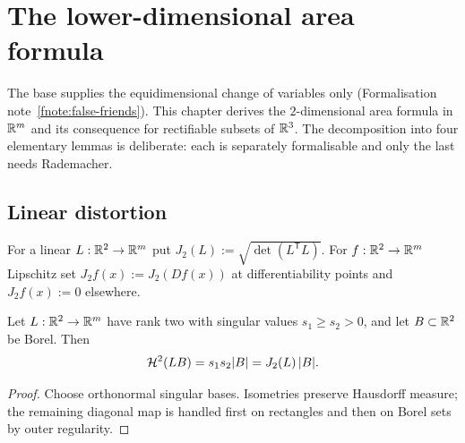 \chapter{The lower-dimensional area formula}\label{ch:area}

The base supplies the equidimensional change of variables only
(Formalisation note~\ref{fnote:false-friends}).  This chapter derives the
$2$-dimensional area formula in $\mathbb R^m$ and its consequence for rectifiable
subsets of $\mathbb R^3$.  The decomposition into four elementary lemmas is
deliberate: each is separately formalisable and only the last needs
Rademacher.

\section{Linear distortion}\label{sec:area-linear}

\begin{definition}[$2$-Jacobian]\label{def:jacobian}
For a linear $L:\mathbb R^2\to\mathbb R^m$ put
$J_2(L):=\sqrt{\det(L^{\mathsf T}L)}$.  For $f:\mathbb R^2\to\mathbb R^m$ Lipschitz set
$J_2f(x):=J_2(Df(x))$ at differentiability points and $J_2f(x):=0$
elsewhere.
\end{definition}

\begin{lemma}\label{lem:linear-distortion}
Let $L:\mathbb R^2\to\mathbb R^m$ have rank two with singular values $s_1\ge s_2>0$, and
let $B\subset\mathbb R^2$ be Borel.  Then
\begin{equation}\label{eq:linear-distortion}
  \mathcal H^2(LB)=s_1s_2|B|=J_2(L)\,|B| .
\end{equation}
\end{lemma}

\begin{proof}
Choose orthonormal singular bases.  Isometries preserve Hausdorff measure;
the remaining diagonal map is handled first on rectangles and then on Borel
sets by outer regularity.
\end{proof}

